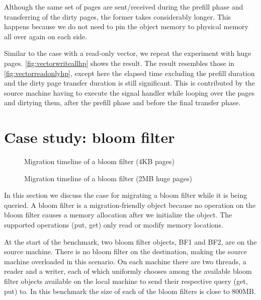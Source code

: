 Although the same set of pages are sent/received during the prefill phase and
transferring of the dirty pages, the former takes considerably longer. This
happens because we do not need to pin the object memory to physical memory all
over again on each side.

Similar to the case with a read-only vector, we repeat the experiment with huge
pages. \autoref{fig:vectorwriteallhp} shows the result. The result resembles
those in \autoref{fig:vectorreadonlyhp}, except here the elapsed time excluding the
prefill duration and the dirty page transfer duration is still significant. This
is contributed by the source machine having to execute the signal
handler while looping over the pages and dirtying them, after the
prefill phase and before the final transfer phase.


\section{Case study: bloom filter}
\label{sec:evalmigfriendly}

\begin{figure}[tp]
    \begin{center}
        
    \end{center}
    \caption{Migration timeline of a bloom filter (4KB pages)}
    \label{fig:bloomfilter}
\end{figure}


\begin{figure}[tp]
    \begin{center}
        
    \end{center}
    \caption{Migration timeline of a bloom filter (2MB huge pages)}
    \label{fig:bloomfilterhp}
\end{figure}


In this section we discuss the case for migrating a bloom filter while it is
being queried. A bloom filter is a migration-friendly object because
no operation on the bloom filter causes a memory allocation after we initialize
the object. The supported operations (put, get) only read or modify memory
locations.

At the start of the benchmark, two bloom filter objects, BF1
and BF2, are on the source machine. There is no bloom filter on the destination,
making the source machine overloaded in this scenario. On each machine there
are two threads, a reader and a writer, each of which uniformly chooses among
the available bloom filter objects available on the local machine to send their
respective query (get, put) to. In this benchmark the size of each of the bloom
filters is close to 800MB.

